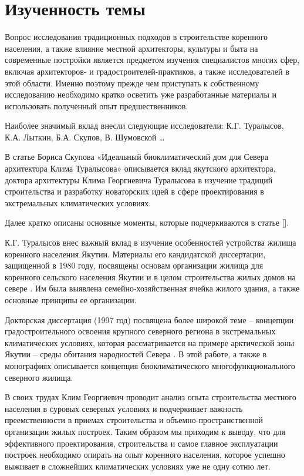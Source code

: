 \section{\textbf{Изученность темы}}


Вопрос исследования традиционных подходов в строительстве коренного населения, а также влияние местной архитекторы,
культуры и быта на современные постройки является предметом изучения специалистов многих сфер, включая архитекторов- и градостроителей-практиков, а также исследователей в этой области.
Именно поэтому прежде чем приступать к собственному исследованию необходимо кратко осветить уже разработанные материалы и использовать полученный опыт предшественников.

Наиболее значимый вклад внесли следующие исследователи: К.Г. Туралысов, К.А. Лыткин, Б.А. Скупов, В. Шумовской …

В статье Бориса Скупова «Идеальный биоклиматический дом для Севера архитектора Клима Туралысова» описывается вклад якутского архитектора,
доктора архитектуры Клима Георгиевича Туралысова в изучение традиций строительства и разработку новаторских идей в сфере проектирования в экстремальных климатических условиях.

Далее кратко описаны основные моменты, которые подчеркиваются в статье [].

К.Г. Туралысов внес важный вклад в изучение особенностей устройства жилища коренного населения Якутии. Материалы его кандидатской диссертации, защищенной в 1980 году,
посвящены основам организации жилища для коренного сельского населения Якутии и в целом строительства жилых домов на севере \cite{1980bu_Turalysov_YakindugenosHabitat}.
Им была выявлена семейно-хозяйственная ячейка жилого здания, а также основные принципы ее организации.  

Докторская диссертация (1997 год) посвящена более широкой теме – концепции градостроительного освоения крупного северного региона в экстремальных климатических условиях,
которая рассматривается на примере арктической зоны Якутии – среды обитания народностей Севера \cite{1980bu_Turalysov_YakindugenosHabitat}.
В этой работе, а также в монографиях описывается концепция биоклиматического многофункционального северного жилища.

В своих трудах Клим Георгиевич проводит анализ опыта строительства местного населения в суровых северных условиях
и подчеркивает важность преемственности в приемах строительства и объемно-пространственной организации жилых построек.
Таким образом мы приходим к выводу, что для эффективного проектирования, строительства и самое главное эксплуатации построек необходимо опирать на опыт коренного населения,
которое успешно выживает в сложнейших климатических условиях уже не одну сотню лет.

